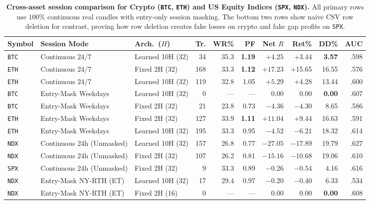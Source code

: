 \documentclass{article}
\begin{document}
\begin{table}[t]
  \centering
  \caption{\textbf{Cross-asset session comparison for Crypto (\texttt{BTC}, \texttt{ETH}) and US Equity Indices (\texttt{SPX}, \texttt{NDX}).} All primary rows use $100\%$ continuous real candles with entry-only session masking. The bottom two rows show naive CSV row deletion for contrast, proving how row deletion creates fake losses on crypto and fake gap profits on \texttt{SPX}.}
  \label{tab:cross_asset_sessions}
  \scriptsize
  \setlength{\tabcolsep}{3.1pt}
  \begin{tabular}{@{}lllrrrrrrr@{}}
    \toprule
    Symbol & Session Mode & Arch.\ ($H$) & Tr. & WR\% & PF & Net $R$ & Ret\% & DD\% & AUC \\
    \midrule
    \texttt{BTC} & Continuous 24/7 & Learned 10H (32) & 34 & 35.3 & \textbf{1.19} & $\mathbf{+4.25}$ & +3.44 & \textbf{3.57} & .598 \\
    \texttt{ETH} & Continuous 24/7 & Fixed 2H (32) & 168 & 33.3 & \textbf{1.12} & $\mathbf{+17.23}$ & +15.65 & 16.55 & .576 \\
    \texttt{ETH} & Continuous 24/7 & Learned 10H (32) & 119 & 32.8 & 1.05 & $+5.29$ & +4.28 & 13.44 & .600 \\
    \texttt{BTC} & Entry-Mask Weekdays & Learned 10H (32) & 0 & --- & --- & $0.00$ & 0.00 & \textbf{0.00} & .607 \\
    \texttt{BTC} & Entry-Mask Weekdays & Fixed 2H (32) & 21 & 23.8 & 0.73 & $-4.36$ & $-4.30$ & 8.65 & .586 \\
    \texttt{ETH} & Entry-Mask Weekdays & Fixed 2H (32) & 127 & 33.9 & \textbf{1.11} & $\mathbf{+11.04}$ & +9.44 & 16.63 & .591 \\
    \texttt{ETH} & Entry-Mask Weekdays & Learned 10H (32) & 195 & 33.3 & 0.95 & $-4.52$ & $-6.21$ & 18.32 & .614 \\
    \midrule
    \texttt{NDX} & Continuous 24h (Unmasked) & Learned 10H (32) & 157 & 26.8 & 0.77 & $-27.05$ & $-17.89$ & 19.79 & .627 \\
    \texttt{NDX} & Continuous 24h (Unmasked) & Fixed 2H (32) & 107 & 26.2 & 0.81 & $-15.16$ & $-10.68$ & 19.06 & .610 \\
    \texttt{SPX} & Continuous 24h (Unmasked) & Fixed 2H (32) & 9 & 33.3 & 0.89 & $-0.26$ & $-0.54$ & 4.16 & .616 \\
    \texttt{NDX} & Entry-Mask NY-RTH (ET) & Learned 10H (32) & 17 & 29.4 & 0.97 & $\mathbf{-0.20}$ & $-0.40$ & 6.33 & .534 \\
    \texttt{NDX} & Entry-Mask NY-RTH (ET) & Fixed 2H (16) & 0 & --- & --- & $\mathbf{0.00}$ & 0.00 & \textbf{0.00} & .608 \\

\end{tabular}
\end{table}
\end{document}
